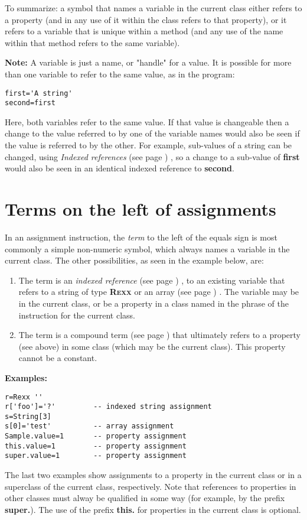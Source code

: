 To summarize: a symbol that names a variable in the current class either
refers to a property (and in any use of it within the class refers to
that property), or it refers to a variable that is unique within a
method (and any use of the name within that method refers to the same
variable).
\begin{shaded}\noindent
\textbf{Note: }
A variable is just a name, or "handle" for a value.
It is possible for more than one variable to refer to the same value, as
in the program:
\begin{lstlisting}
first='A string'
second=first
\end{lstlisting}
Here, both variables refer to the same value.  If that value is
changeable then a change to the value referred to by one of the
variable names would also be seen if the value is referred to by the
other.
For example, sub-values of a \nr{} string can be changed, using
 \emph{Indexed references} (see page \pageref{refinstr}) , so a change to a
sub-value of \textbf{first} would also be seen in an identical indexed
reference to \textbf{second}.
\end{shaded}\indent
\section{Terms on the left of assignments}
 
In an assignment instruction, the \emph{term} to the left of the
equals sign is most commonly a simple non-numeric symbol, which
always names a variable in the current class.
The other possibilities, as seen in the example below, are:
\begin{enumerate}
\item 
The term is an  \emph{indexed reference} (see page \pageref{refinstr}) , to an
existing variable that refers to a string of type \textbf{R\textsc{exx}} or an
 array (see page \pageref{refarray}) .
The variable may be in the current class, or be a property in a class
named in the  phrase of the  instruction for
the current class.
\item 
The term is a  compound term (see page \pageref{refcomterm})  that ultimately refers
to a property (see above) in some class (which may be the current class).
This property cannot be a constant.
\end{enumerate}
 \textbf{Examples:}
\begin{lstlisting}
r=Rexx ''
r['foo']='?'         -- indexed string assignment
s=String[3]
s[0]='test'          -- array assignment
Sample.value=1       -- property assignment
this.value=1         -- property assignment
super.value=1        -- property assignment
\end{lstlisting}

The last two examples show assignments to a property in the current
class or in a superclass of the current class, respectively.  Note that
references to properties in other classes must alway be qualified in
some way (for example, by the prefix \textbf{super.}).  The use of the
prefix \textbf{this.} for properties in the current class is optional.
